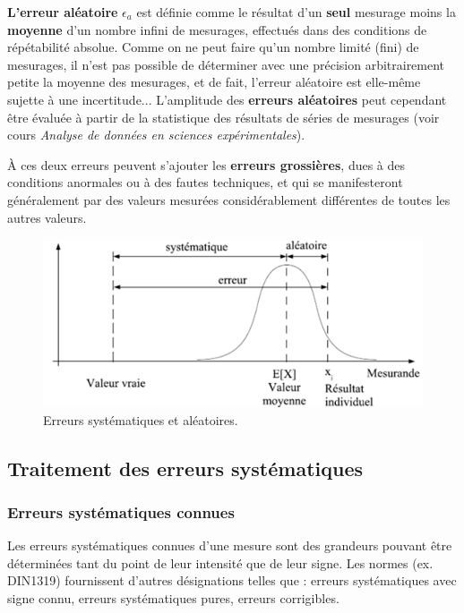 \textbf{L'erreur aléatoire} $\epsilon_a$ est définie comme le résultat d'un \textbf{seul} mesurage moins la \textbf{moyenne} d'un nombre infini de mesurages, effectués dans des conditions de répétabilité absolue. Comme on ne peut faire qu'un nombre limité (fini) de mesurages, il n'est pas possible de déterminer avec une précision arbitrairement petite la moyenne des mesurages, et de fait, l'erreur aléatoire est elle-même sujette à une incertitude... L'amplitude des \textbf{erreurs aléatoires} peut cependant être évaluée à partir de la statistique des résultats de séries de mesurages (voir cours \textit{Analyse de données en sciences expérimentales}).

À ces deux erreurs peuvent s'ajouter les \textbf{erreurs grossières}, dues à des conditions anormales ou à des fautes techniques, et qui se manifesteront généralement par des valeurs mesurées considérablement différentes de toutes les autres valeurs.
\begin{figure}[t]
    \centering
    \includegraphics[width=14cm]{assets/figures/errsysale.pdf}
    \caption{Erreurs systématiques et aléatoires.}
    \label{fig:example}
\end{figure}

\subsection{Traitement des erreurs systématiques}

\subsubsection{Erreurs systématiques connues}

Les erreurs systématiques connues d'une mesure sont des grandeurs pouvant être déterminées tant du point de leur intensité que de leur signe. Les normes (ex. DIN1319) fournissent d'autres désignations telles que : erreurs systématiques avec signe connu, erreurs systématiques pures, erreurs corrigibles.

